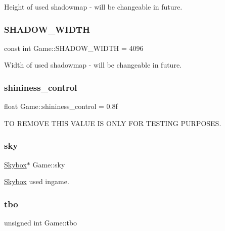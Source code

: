 Height of used shadowmap -\/ will be changeable in future. 

\mbox{\label{class_game_abf4d8e38c95fc6e1351e6dd85a19429f}} 
\subsubsection{\texorpdfstring{SHADOW\_WIDTH}{SHADOW\_WIDTH}}
{\footnotesize\ttfamily const int Game\+::\+S\+H\+A\+D\+O\+W\+\_\+\+W\+I\+D\+TH = 4096\hspace{0.3cm}{\ttfamily [protected]}}



Width of used shadowmap -\/ will be changeable in future. 

\mbox{\label{class_game_a91b5545f94ad9a83bac6d9be6ef15737}} 
\subsubsection{\texorpdfstring{shininess\_control}{shininess\_control}}
{\footnotesize\ttfamily float Game\+::shininess\+\_\+control = 0.\+8f}



TO R\+E\+M\+O\+VE T\+H\+IS V\+A\+L\+UE IS O\+N\+LY F\+OR T\+E\+S\+T\+I\+NG P\+U\+R\+P\+O\+S\+ES. 

\mbox{\label{class_game_a46b9b13579445bc071f6cba24953b531}} 
\subsubsection{\texorpdfstring{sky}{sky}}
{\footnotesize\ttfamily \mbox{\hyperlink{class_skybox}{Skybox}}$\ast$ Game\+::sky}



\mbox{\hyperlink{class_skybox}{Skybox}} used ingame. 

\mbox{\label{class_game_af04f4198d017854557726ab48726e709}} 
\subsubsection{\texorpdfstring{tbo}{tbo}}
{\footnotesize\ttfamily unsigned int Game\+::tbo\hspace{0.3cm}{\ttfamily [protected]}}



